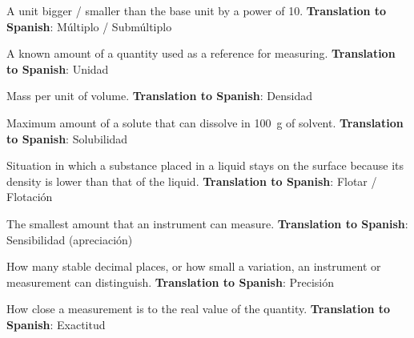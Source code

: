 \begin{vocabulary}
    A unit bigger / smaller than the base unit by a power of 10. \newline
    \textbf{Translation to Spanish}: Múltiplo / Submúltiplo
\end{vocabulary}

\begin{vocabulary}[Unit]
    A known amount of a quantity used as a reference for measuring. \newline
    \textbf{Translation to Spanish}: Unidad
\end{vocabulary}

\begin{vocabulary}[Density]
    Mass per unit of volume. \newline
    \textbf{Translation to Spanish}: Densidad
\end{vocabulary}

\begin{vocabulary}[Solubility]
    Maximum amount of a solute that can dissolve in \qty{100}{\g} of solvent. \newline
    \textbf{Translation to Spanish}: Solubilidad
\end{vocabulary}

\begin{vocabulary}[Floating]
    Situation in which a substance placed in a liquid stays on the surface because its density is lower than that of the liquid. \newline
    \textbf{Translation to Spanish}: Flotar / Flotación
\end{vocabulary}

\begin{vocabulary}[Sensitivity]
    The smallest amount that an instrument can measure. \newline
    \textbf{Translation to Spanish}: Sensibilidad (apreciación)
\end{vocabulary}

\begin{vocabulary}[Precision]
    How many stable decimal places, or how small a variation, an instrument or measurement can distinguish. \newline
    \textbf{Translation to Spanish}: Precisión
\end{vocabulary}

\begin{vocabulary}[Accuracy]
    How close a measurement is to the real value of the quantity. \newline
    \textbf{Translation to Spanish}: Exactitud
\end{vocabulary}

